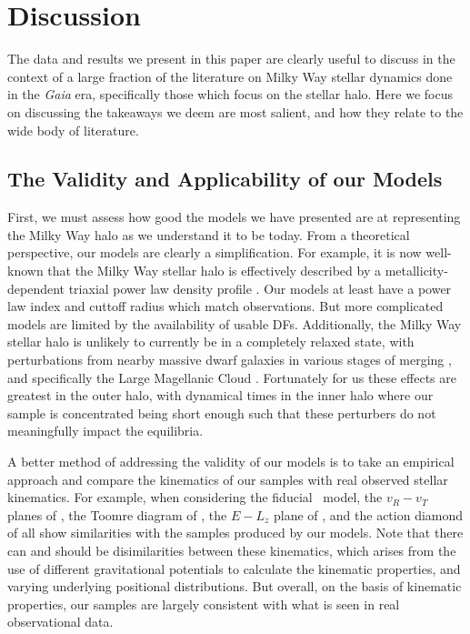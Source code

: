 \section{Discussion}
\label{ch2:sec:Discussion}

The data and results we present in this paper are clearly useful to discuss in the context of a large fraction of the literature on Milky Way stellar dynamics done in the \textit{Gaia} era, specifically those which focus on the stellar halo. Here we focus on discussing the takeaways we deem are most salient, and how they relate to the wide body of literature.

\subsection{The Validity and Applicability of our Models}

First, we must assess how good the models we have presented are at representing the Milky Way halo as we understand it to be today. From a theoretical perspective, our models are clearly a simplification. For example, it is now well-known that the Milky Way stellar halo is effectively described by a metallicity-dependent triaxial power law density profile \parencite[e.g.,][]{mackereth20}. Our models at least have a power law index and cuttoff radius which match observations. But more complicated models are limited by the availability of usable DFs. Additionally, the Milky Way stellar halo is unlikely to currently be in a completely relaxed state, with perturbations from nearby massive dwarf galaxies in various stages of merging \parencite{garrow20}, and specifically the Large Magellanic Cloud \parencite{erkal19}. Fortunately for us these effects are greatest in the outer halo, with dynamical times in the inner halo where our sample is concentrated being short enough such that these perturbers do not meaningfully impact the equilibria.

A better method of addressing the validity of our models is to take an empirical approach and compare the kinematics of our samples with real observed stellar kinematics. For example, when considering the fiducial \survey\ model, the $v_{R}-v_{T}$ planes of \textcite{belokurov18,fattahi19,naidu20}, the Toomre diagram of \textcite{helmi18,koppelman19b}, the $E-L_{z}$ plane of \textcite{helmi18,koppelman19b,naidu20}, and the action diamond of \parencite[normalized to be a circle, ][]{naidu20} all show similarities with the samples produced by our models. Note that there can and should be disimilarities between these kinematics, which arises from the use of different gravitational potentials to calculate the kinematic properties, and varying underlying positional distributions. But overall, on the basis of kinematic properties, our samples are largely consistent with what is seen in real observational data.

